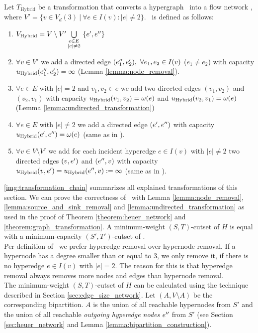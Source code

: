 \begin{definition}
Let $T_{\text{Hybrid}}$ be a transformation that converts a hypergraph \HypergraphDef~into 
a flow network \Hybrid, where $V' = \{v \in V_d(3)\ |\ \forall e \in I(v): |e| \neq 2\}$. 
\ShortHybrid~is defined as follows:
\begin{enumerate}
\item $V_{\text{Hybrid}} = V\setminus V' \bigcup\limits_{\substack{e \in E \\ |e| \neq 2}}\ \{e', e''\}$
\item $\forall v \in V'$ we add a directed edge $(e_1'', e_2'),\ \forall e_1, e_2 \in I(v)$ 
      ($e_1 \neq e_2$) with capacity $u_{\text{Hybrid}}(e_1'', e_2') = \infty$ (Lemma \ref{lemma:node_removal}).
\item $\forall e \in E$ with $|e| = 2$ and $v_1,v_2 \in e$ we add 
      two directed edges $(v_1,v_2)$ and $(v_2,v_1)$ with capacity $u_{\text{Hybrid}}(v_1,v_2) = \omega(e)$
      and $u_{\text{Hybrid}}(v_2,v_1) = \omega(e)$ (Lemma \ref{lemma:undirected_transformation})
\item $\forall e \in E$ with $|e| \neq 2$ we add a directed edge $(e',e'')$
      with capacity $u_{\text{Hybrid}}(e',e'') = \omega(e)$ (same as in ).
\item $\forall v \in V\setminus V'$ we add for each incident hyperedge $e \in I(v)$ with $|e| \neq 2$ 
      two directed edges $(v,e')$ and $(e'',v)$ with capacity 
      $u_{\text{Hybrid}}(v,e') = u_{\text{Hybrid}}(e'',v) := \infty$ (same as in ).
\end{enumerate} 
\end{definition}

\autoref{img:transformation_chain} summarizes all explained transformations of this section.
We can prove the correctness of \ShortHybrid~with Lemma \ref{lemma:node_removal}, \ref{lemma:source_and_sink_removal}
and \ref{lemma:undirected_transformation} as used in the proof of Theorem \ref{theorem:heuer_network}
and \ref{theorem:graph_transformation}. A minimum-weight $(S,T)$-cutset of $H$ is equal with a
minimum-capacity $(S',T')$-cutset of \ShortHybrid. \\
Per definition of \ShortHybrid~we prefer hyperedge removal over hypernode removal. If
a hypernode has a degree smaller than or equal to $3$, we only remove it, if there is no hyperedge
$e \in I(v)$ with $|e| = 2$. The reason for this is that hyperedge removal always removes more nodes
and edges than hypernode removal. \\
The minimum-weight $(S,T)$-cutset of $H$ can be calculated using the technique described in Section
\ref{sec:edge_size_network}. Let $(A,V\setminus A)$ be the corresponding bipartition.
$A$ is the union of all reachable hypernodes from $S'$ and the union of
all reachable \emph{outgoing hyperedge nodes} $e''$ from $S'$ (see Section \ref{sec:heuer_network} 
and Lemma \ref{lemma:bipartition_construction}). 
